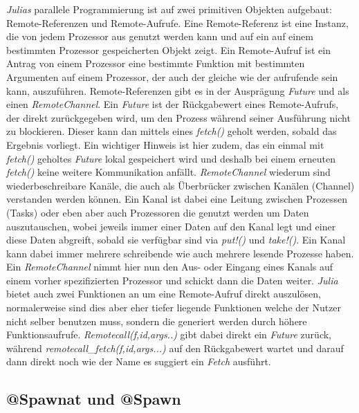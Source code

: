 \documentclass[proseminar,german,utf8]{zihpub}
\begin{document}
\textit{Julias} parallele Programmierung ist auf zwei primitiven Objekten aufgebaut: Remote-Referenzen und Remote-Aufrufe. Eine Remote-Referenz ist eine Instanz, die von jedem Prozessor aus genutzt werden kann und auf ein auf einem bestimmten Prozessor gespeicherten Objekt zeigt. Ein Remote-Aufruf ist ein Antrag von einem Prozessor eine bestimmte Funktion mit bestimmten Argumenten auf einem Prozessor, der auch der gleiche wie der aufrufende sein kann, auszuführen. Remote-Referenzen gibt es in der Ausprägung \textit{Future} und als einen \textit{RemoteChannel}. Ein \textit{Future} ist der Rückgabewert eines Remote-Aufrufs, der direkt zurückgegeben wird, um den Prozess während seiner Ausführung nicht zu blockieren. Dieser kann dan mittels eines \textit{fetch()} geholt werden, sobald das Ergebnis vorliegt. Ein wichtiger Hinweis ist hier zudem, das ein einmal mit \textit{fetch()} geholtes \textit{Future} lokal gespeichert wird und deshalb bei einem erneuten \textit{fetch()} keine weitere Kommunikation anfällt. \textit{RemoteChannel} wiederum sind wiederbeschreibare Kanäle, die auch als Überbrücker zwischen Kanälen (Channel) verstanden werden können. Ein Kanal ist dabei eine Leitung zwischen Prozessen (Tasks) oder eben aber auch Prozessoren die genutzt werden um Daten auszutauschen, wobei jeweils immer einer Daten auf den Kanal legt und einer diese Daten abgreift, sobald sie verfügbar sind via \textit{put!()} und \textit{take!()}. Ein Kanal kann dabei immer mehrere schreibende wie auch mehrere lesende Prozesse haben. Ein \textit{RemoteChannel} nimmt hier nun den Aus- oder Eingang eines Kanals auf einem vorher spezifizierten Prozessor und schickt dann die Daten weiter. \textit{Julia} bietet auch zwei Funktionen an um eine Remote-Aufruf direkt auszulösen, normalerweise sind dies aber eher tiefer liegende Funktionen welche der Nutzer nicht selber benutzen muss, sondern die generiert werden durch höhere Funktionsaufrufe. \textit{Remotecall(f,id,args..)} gibt dabei direkt ein \textit{Future} zurück, während \textit{remotecall\_fetch(f,id,args...)} auf den Rückgabewert wartet und darauf dann direkt noch wie der Name es suggiert ein \textit{Fetch} ausführt.

\subsection{@Spawnat und @Spawn}
\end{document}
